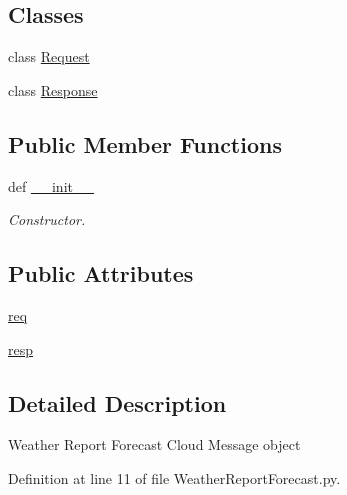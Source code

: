 \subsection*{Classes}
\begin{DoxyCompactItemize}
\item 
class \hyperlink{classRappCloud_1_1CloudMsgs_1_1WeatherReportForecast_1_1WeatherReportForecast_1_1Request}{Request}
\item 
class \hyperlink{classRappCloud_1_1CloudMsgs_1_1WeatherReportForecast_1_1WeatherReportForecast_1_1Response}{Response}
\end{DoxyCompactItemize}
\subsection*{Public Member Functions}
\begin{DoxyCompactItemize}
\item 
def \hyperlink{classRappCloud_1_1CloudMsgs_1_1WeatherReportForecast_1_1WeatherReportForecast_ac334746afd39150c42b70dba1c8cd933}{\-\_\-\-\_\-init\-\_\-\-\_\-}
\begin{DoxyCompactList}\small\item\em Constructor. \end{DoxyCompactList}\end{DoxyCompactItemize}
\subsection*{Public Attributes}
\begin{DoxyCompactItemize}
\item 
\hyperlink{classRappCloud_1_1CloudMsgs_1_1WeatherReportForecast_1_1WeatherReportForecast_af6280b4244a053f384797a05ae1ec9c2}{req}
\item 
\hyperlink{classRappCloud_1_1CloudMsgs_1_1WeatherReportForecast_1_1WeatherReportForecast_a666e32ff92643879e9f9cb9e42f0762f}{resp}
\end{DoxyCompactItemize}


\subsection{Detailed Description}
\begin{DoxyVerb}Weather Report Forecast Cloud Message object \end{DoxyVerb}
 

Definition at line 11 of file Weather\-Report\-Forecast.\-py.



